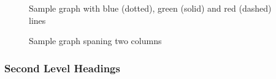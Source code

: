 \documentclass{cta-author}
\begin{document}
\begin{figure}[!t]
\caption{Sample graph with blue (dotted), green (solid) and red (dashed) lines
\label{fig1}}
\end{figure}

\begin{figure}[!b]
\caption{Sample graph spaning two columns\label{fig2}}
\end{figure}

\subsubsection{Second Level Headings}\label{subsubsec5.3.2}
\end{document}
